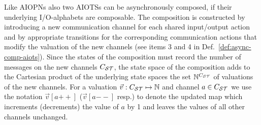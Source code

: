 Like AIOPNs also two AIOTSs can be asynchronously composed, if their underlying I/O-alphabets are composable. The composition is constructed by introducing a new communication channel
for each shared input/output action and by appropriate transitions for the corresponding communication actions that modify the valuation of the new channels (see items 3 and 4 in Def.~\ref{def:async-comp-aiots}). %
Since the states of the composition must record the number of messages on the new channels $C_{\mathcal{S}\mathcal{T}}$, the state space of the composition adds to the Cartesian product of the underlying state spaces the set $\mathbb{N}^{C_{\mathcal{S}\mathcal{T}}}$ of valuations of the new channels. 
For a valuation $\vec{v}: C_{\mathcal{S}\mathcal{T}} \mapsto \mathbb{N}$ and channel $a \in C_{\mathcal{S}\mathcal{T}}$ we use the notation $\vec{v}[a\mathrm{++}]$ ($\vec{v}[a\mathrm{--}]$ resp.) to denote the updated map which increments (decrements) the value of $a$ by 1 and leaves the values of all other channels unchanged.

